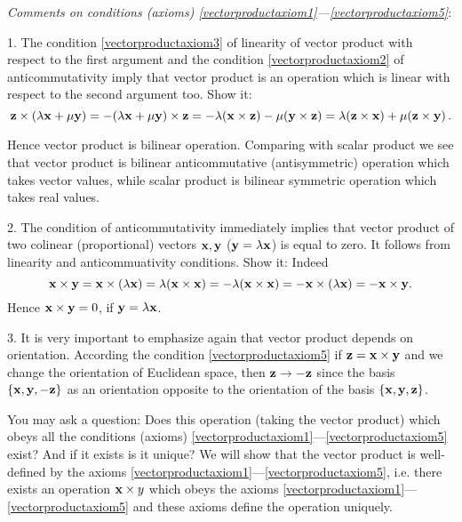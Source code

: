 \documentclass[12pt]{article}
\numberwithin{equation}{section}
\begin{document}

{\it Comments on conditions (axioms) \eqref{vectorproductaxiom1}---\eqref{vectorproductaxiom5}}:

\m



1. The condition \eqref{vectorproductaxiom3} of linearity of vector product with respect to the first argument
   and the condition \eqref{vectorproductaxiom2} of anticommutativity
   imply that vector product is an operation which is
  linear with respect to the
  second argument too. Show it:
        \begin{equation*}\label{}
 {\bf z}\times(\lambda{\bf x}+\mu {\bf y})=-(\lambda{\bf x}+\mu {\bf y})\times {\bf z}=
 -\lambda ({\bf x}\times {\bf z})-\mu ({\bf y}\times {\bf z})=
  \lambda ({\bf z}\times {\bf x})+\mu({\bf z}\times {\bf y})\,.
\end{equation*}

Hence vector product is bilinear operation. Comparing with scalar product we see that
  vector product is bilinear anticommutative (antisymmetric) operation which takes vector values,
   while scalar product is bilinear symmetric operation which takes real values.

\m

2. The condition of anticommutativity immediately implies that
      vector product of two colinear (proportional) vectors ${\bf x},{\bf y}$ (${\bf y}=\lambda {\bf x}$) is equal to zero.
  It follows from linearity and anticommuativity conditions. Show it:   Indeed
                 \begin{equation}\label{colinearvectors}
   {\bf x}\times {\bf y}={\bf x}\times (\lambda {\bf x})=\lambda ({\bf x}\times {\bf x})=-\lambda ({\bf x}\times{\bf x})=-{\bf x}\times (\lambda {\bf x})=-{\bf x}\times {\bf y}.
\end{equation}
 Hence ${\bf x}\times {\bf y}=0$, if ${\bf y}=\lambda {\bf x}$\finish.



3. It is very important to emphasize again that vector product depends on orientation.
According the condition \eqref{vectorproductaxiom5} if ${\bf z}={\bf x}\times {\bf y}$ and
we change the orientation of Euclidean space, then ${\bf z}\to -{\bf z}$ since the basis $\{{\bf x},{\bf y},-{\bf z}\}$
as an orientation opposite to the orientation of the basis  $\{{\bf x},{\bf y},{\bf z}\}$.
\m




{\footnotesize   You may ask a question:
Does this operation (taking the vector product) which obeys all the conditions (axioms)
\eqref{vectorproductaxiom1}---\eqref{vectorproductaxiom5} exist? And if it exists is it unique?
  We will show that the vector product is well-defined by the axioms
  \eqref{vectorproductaxiom1}---\eqref{vectorproductaxiom5}, i.e. there exists an operation
  ${\bf x}\times y$ which obeys the axioms  \eqref{vectorproductaxiom1}---\eqref{vectorproductaxiom5}
  and these axioms define the operation uniquely.}
\end{document}
